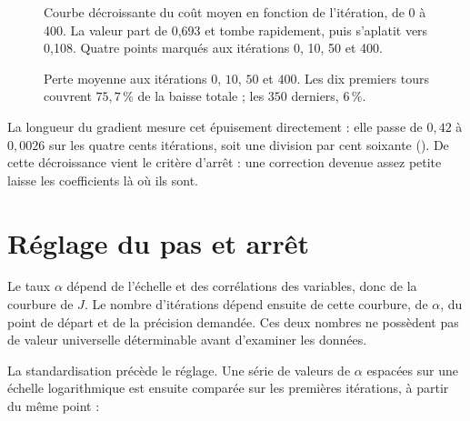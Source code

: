 \begin{figure}[htbp]
\centering
\begin{graphique}{Courbe décroissante du coût moyen en fonction de l'itération, de 0 à 400. La valeur part de 0,693 et tombe rapidement, puis s'aplatit vers 0,108. Quatre points marqués aux itérations 0, 10, 50 et 400.}
\end{graphique}
\caption{Perte moyenne aux itérations $0$, $10$, $50$ et $400$. Les dix premiers
tours couvrent $75{,}7\,\%$ de la baisse totale ; les $350$ derniers, $6\,\%$.}
\label{fig:cout}
\end{figure}
\FloatBarrier

La longueur du gradient mesure cet épuisement directement : elle passe de
$0{,}42$ à $0{,}0026$ sur les quatre cents itérations, soit une division par cent
soixante (). De cette décroissance vient le critère
d'arrêt : une correction devenue assez petite laisse les coefficients là où ils
sont.

\section{Réglage du pas et arrêt}

Le taux $\alpha$ dépend de l'échelle et des corrélations des variables, donc de
la courbure de $J$. Le nombre d'itérations dépend ensuite de cette courbure, de
$\alpha$, du point de départ et de la précision demandée. Ces deux nombres ne
possèdent pas de valeur universelle déterminable avant d'examiner les données.

La standardisation précède le réglage. Une série de valeurs de $\alpha$ espacées
sur une échelle logarithmique est ensuite comparée sur les premières
itérations, à partir du même point :

\begin{panelenumerate}[rulecolor]
\end{panelenumerate}

